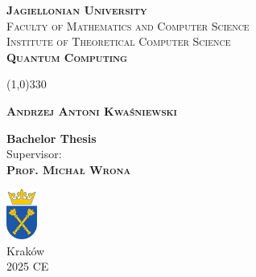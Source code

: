 \begin{titlepage}
    \begin{center}
        \textbf{\textsc{Jagiellonian University}} \\
        {\textsc{Faculty of Mathematics and Computer Science}}\\
        {\textsc{Institute of Theoretical Computer Science}}\\
        \vfill
        \Huge
        \textbf{\textsc{Quantum Computing}}

        \Large
        \line(1,0){330}


        \textbf{\textsc{Andrzej Antoni Kwaśniewski}}

        \vspace{1cm}




        \vspace{1cm}
        \textbf{Bachelor Thesis}\\
        \Large
        Supervisor: \\
        \textbf{\textsc{Prof. Michał Wrona}}

        \vfill

       \includegraphics[width=1cm]{figures/uj-logo-kolor.png} \\
        Kraków \\
        2025 CE
    \end{center}
\end{titlepage}
